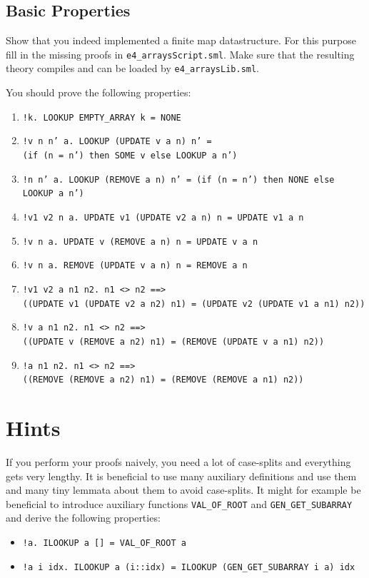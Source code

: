\documentclass[a4paper,10pt,oneside]{scrartcl}
\begin{document}
\subsection{Basic Properties}

Show that you indeed implemented a finite map datastructure. For this purpose fill in the missing
proofs in \texttt{e4\_arraysScript.sml}. Make sure that the resulting theory compiles and can be loaded by \texttt{e4\_arraysLib.sml}.

You should prove the following properties:

\begin{enumerate}
\item \texttt{!k.\ LOOKUP EMPTY\_ARRAY k = NONE}
\item \texttt{!v n n' a.\ LOOKUP (UPDATE v a n) n' =\\
\-\qquad (if (n = n') then SOME v else LOOKUP a n')}
\item \texttt{!n n' a.\ LOOKUP (REMOVE a n) n' = (if (n = n') then NONE else LOOKUP a n')}
\item \texttt{!v1 v2 n a.\ UPDATE v1 (UPDATE v2 a n) n = UPDATE v1 a n}
\item \texttt{!v n a.\ UPDATE v (REMOVE a n) n = UPDATE v a n}
\item \texttt{!v n a.\ REMOVE (UPDATE v a n) n = REMOVE a n}
\item \texttt{!v1 v2 a n1 n2.\ n1 <> n2 ==>\\\-\qquad
     ((UPDATE v1 (UPDATE v2 a n2) n1) = (UPDATE v2 (UPDATE v1 a n1) n2))}
 \item \texttt{!v a n1 n2.\ n1 <> n2 ==>\\\-\qquad
     ((UPDATE v (REMOVE a n2) n1) = (REMOVE (UPDATE v a n1) n2))}
 \item \texttt{!a n1 n2.\ n1 <> n2 ==>\\\-\qquad
     ((REMOVE (REMOVE a n2) n1) = (REMOVE (REMOVE a n1) n2))}
\end{enumerate}

\section{Hints}

If you perform your proofs naively, you need a lot of case-splits and everything gets
very lengthy. It is beneficial to use many auxiliary definitions and use them and many tiny
lemmata about them to avoid case-splits. It might for example be beneficial to introduce auxiliary
functions \texttt{VAL\_OF\_ROOT} and \texttt{GEN\_GET\_SUBARRAY} and derive the following properties:
\begin{itemize}
\item \texttt{!a. ILOOKUP a [] = VAL\_OF\_ROOT a}
\item \texttt{!a i idx.\ ILOOKUP a (i::idx) = ILOOKUP (GEN\_GET\_SUBARRAY i a) idx}
\end{itemize}
\end{document}

